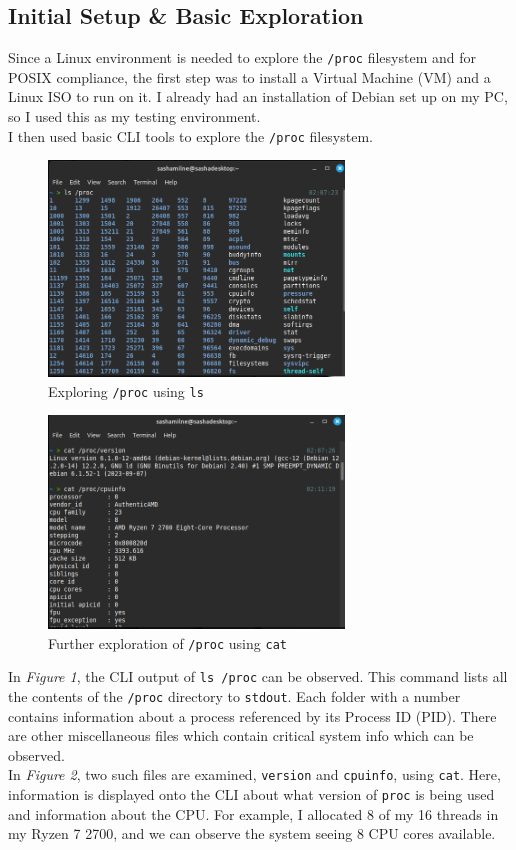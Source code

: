 \subsection{Initial Setup \& Basic Exploration}\label{subsec:steps-1-3:-initial-setup-&-basic-exploration}
Since a Linux environment is needed to explore the \texttt{/proc} filesystem
and for POSIX compliance, the first step was to install a Virtual Machine (VM)
and a Linux ISO to run on it.
I already had an installation of Debian set up on my PC, so I used this as my testing environment.\\
I then used basic CLI tools to explore the \texttt{/proc} filesystem.
\begin{figure}[H]
    \centering
    \includegraphics[width=0.7\textwidth]{../../screenshots/step1-lsproc}
    \caption{Exploring \texttt{/proc} using \texttt{ls}}
    \label{fig:step1-lsproc}
\end{figure}
\begin{figure}[H]
    \centering
    \includegraphics[width=0.7\textwidth]{../../screenshots/step2-3-catproc}
    \caption{Further exploration of \texttt{/proc} using \texttt{cat}}
    \label{fig:step2-3-catproc}
\end{figure}
\afterfloat
In \textit{Figure 1}, the CLI output of \texttt{ls /proc} can be observed.
This command lists all the contents of the \texttt{/proc} directory to \texttt{stdout}.
Each folder with a number contains information about a process referenced by its Process ID (PID)\@.
There are other miscellaneous files which contain critical system info which can be observed.\\
In \textit{Figure 2}, two such files are examined, \texttt{version} and \texttt{cpuinfo}, using \texttt{cat}.
Here, information is displayed onto the CLI about what version of \texttt{proc} is being used
and information about the CPU\@.
For example, I allocated 8 of my 16 threads in my Ryzen 7 2700,
and we can observe the system seeing 8 CPU cores available.

